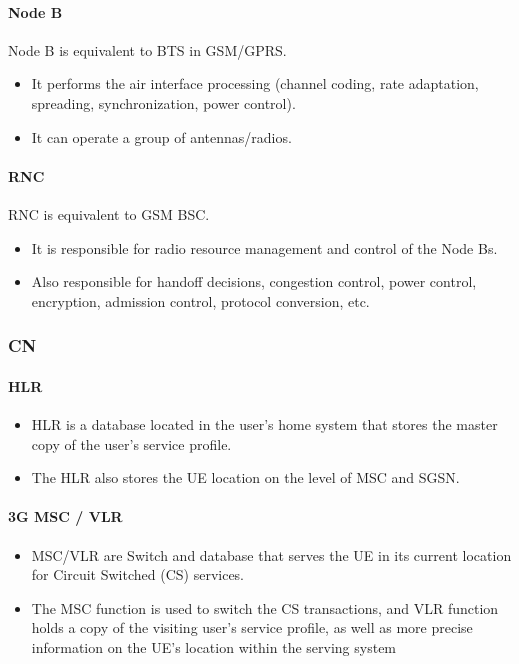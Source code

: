 \paragraph{Node B}
 Node B is equivalent to BTS in GSM/GPRS.
 \begin{itemize}
 	\item It performs the air interface processing (channel coding, rate adaptation, spreading, synchronization, power control).
 	\item It can operate a group of antennas/radios. 
 \end{itemize}

\paragraph{RNC}
RNC is equivalent to GSM BSC.
\begin{itemize}
	\item It is responsible for radio resource management and control of the Node Bs.
	\item Also responsible for handoff decisions, congestion control, power control, encryption, admission control, protocol conversion, etc. 
\end{itemize}


\subsubsection{CN}

\paragraph{HLR}
\begin{itemize}
	\item HLR is a database located in the user’s home system that stores the master copy of the user’s service profile.
	\item The HLR also stores the UE location on the level of MSC and SGSN.
\end{itemize}

\paragraph{3G MSC / VLR}
\begin{itemize}
	\item MSC/VLR are Switch and database that serves the UE in its current location for Circuit Switched (CS) services. 
	\item The MSC function is used to switch the CS	transactions, and VLR function holds a copy of the visiting user’s service
	profile, as well as more precise information on the UE’s location within the serving system
\end{itemize}

